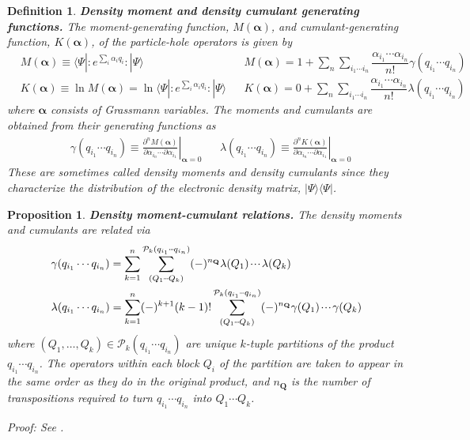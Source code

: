 \documentclass[11pt,fleqn]{article}
\renewcommand{\a}{\alpha}    %
\newcommand{\g}{\gamma}      %
\newcommand{\la}{\lambda}    %
\newcommand{\Y}{\Psi}        %
\newcommand{\ld}{\ensuremath{\ldots}}
\newcommand{\cd}{\ensuremath{\cdots}}
\newcommand{\etc}{\ensuremath{\mathinner{\mkern-1mu\cdotp\mkern-2mu\cdotp\mkern-2mu\cdotp\mkern-1mu}}}
\newcommand{\bmit}[1]{{\bfseries\itshape\mathversion{bold}#1}}
\newcommand{\mc}[1]{\ensuremath{\mathcal{#1}}}
\newcommand{\bo}[1]{\ensuremath{\mathbf{#1}}}
\newcommand{\fr}[2]{\ensuremath{\dfrac{#1}{#2}}}
\newcommand{\pd}[2]{\ensuremath{\frac{\partial#1}{\partial#2}}}
\newcommand{\pt}{\ensuremath{\partial}}
\newcommand{\br}[1]{\ensuremath{\langle#1|}}
\newcommand{\kt}[1]{\ensuremath{|#1\rangle}}
\newcommand{\ip}[1]{\ensuremath{\langle#1\rangle}}
\newcommand{\NO}[1]{\ensuremath{{\bm{:}}#1{}{\bm{:}}}}
\theoremstyle{mystyle}
\newtheorem{dfn}{Definition}[section]
\newtheorem{pro}{Proposition}[section]
\numberwithin{equation}{section}
\begin{document}
\begin{dfn}
\bmit{Density moment and density cumulant generating functions.}
The \textit{moment-generating function}, $M(\bm\a)$, and \textit{cumulant-generating function}, $K(\bm\a)$, of the particle-hole operators is given by
\begin{align}
&
  M(\bm\a)
\equiv
  \ip{\Y|\NO{e^{\sum_i\a_i q_i}}|\Y}
&&
  M(\bm\a)
=
  1
+
  \sum_n
  \sum_{i_1\cd i_n}
  \fr{\a_{i_1}\cd \a_{i_n}}{n!}
  \g(q_{i_1}\cd q_{i_n})
\\
&
  K(\bm\a)
\equiv
  \ln M(\bm\a)
=
  \ln \ip{\Y|\NO{e^{\sum_i\a_i q_i}}|\Y}
&&
  K(\bm\a)
=
  0
+
  \sum_n
  \sum_{i_1\cd i_n}
  \fr{\a_{i_1}\cd \a_{i_n}}{n!}
  \la(q_{i_1}\cd q_{i_n})
\end{align}
where $\bm\a$ consists of Grassmann variables.
The \textit{moments} and \textit{cumulants} are obtained from their generating functions as 
\begin{align}
&
  \g(q_{i_1}\cd q_{i_n})
\equiv
  \left.
  \pd{^n M(\bm\a)}{\a_{i_n}\cd\pt\a_{i_1}}
  \right|_{\bm\a=0}
&&
  \la(q_{i_1}\cd q_{i_n})
\equiv
  \left.
  \pd{^n K(\bm\a)}{\a_{i_n}\cd\pt\a_{i_1}}
  \right|_{\bm\a=0}
\end{align}
These are sometimes called \textit{density moments} and \textit{density cumulants} since they characterize the distribution of the electronic density matrix, $\kt{\Y}\br{\Y}$.
\end{dfn}

\begin{pro}
\label{moment-cumulant-relations-quantum}
\bmit{Density moment-cumulant relations.}
\textit{The density moments and cumulants are related via
\begin{align}
\label{moments-from-cumulants-quantum}
&
  \g(q_{i_1}\cd q_{i_n})
=
  \sum_{k=1}^n
  \sum_{(Q_1\etc Q_k)}^{\mc{P}_k(q_{i_1}\etc q_{i_n})}
  (-)^{n_{\bo{Q}}}
  \la(Q_1)\etc\la(Q_k)
\\
\label{cumulants-from-moments-quantum}
&
  \la(q_{i_1}\cd q_{i_n})
=
  \sum_{k=1}^n
  (-)^{k+1}
  (k-1)!
  \sum_{(Q_1\etc Q_k)}^{\mc{P}_k(q_{i_1}\etc q_{i_n})}
  (-)^{n_{\bo{Q}}}
  \g(Q_1)\etc\g(Q_k)
\end{align}
where $(Q_1,\ld,Q_k)\in\mc{P}_k(q_{i_1}\cd q_{i_n})$ are unique $k$-tuple partitions of the product $q_{i_1}\cd q_{i_n}$.
The operators within each block $Q_i$ of the partition are taken to appear in the same order as they do in the original product, and $n_{\bo{Q}}$ is the number of transpositions required to turn $q_{i_1}\cd q_{i_n}$ into $Q_1\cd Q_k$.}
\begin{addmargin}[1em]{0em}
Proof: See .
\end{addmargin}
\end{pro}
\end{document}

